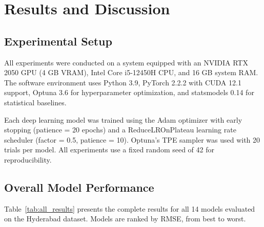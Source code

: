 \chapter{Results and Discussion}

\section{Experimental Setup}

All experiments were conducted on a system equipped with an NVIDIA RTX 2050 GPU (4 GB VRAM), Intel Core i5-12450H CPU, and 16 GB system RAM. The software environment uses Python 3.9, PyTorch 2.2.2 with CUDA 12.1 support, Optuna 3.6 for hyperparameter optimization, and statsmodels 0.14 for statistical baselines.

Each deep learning model was trained using the Adam optimizer with early stopping (patience = 20 epochs) and a ReduceLROnPlateau learning rate scheduler (factor = 0.5, patience = 10). Optuna's TPE sampler was used with 20 trials per model. All experiments use a fixed random seed of 42 for reproducibility.

\section{Overall Model Performance}

Table~\ref{tab:all_results} presents the complete results for all 14 models evaluated on the Hyderabad dataset. Models are ranked by RMSE, from best to worst.

